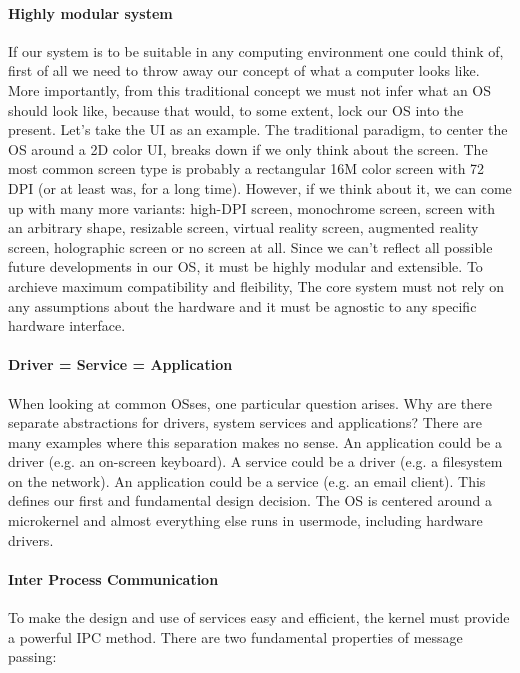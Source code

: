 \documentclass[a4paper]{article}
\begin{document}
\paragraph{Highly modular system} If our system is to be suitable in any computing environment one could think of, first of all we need to throw away our concept of what a computer looks like. More importantly, from this traditional concept we must not infer what an OS should look like, because that would, to some extent, lock our OS into the present. Let's take the UI as an example. The traditional paradigm, to center the OS around a 2D color UI, breaks down if we only think about the screen. The most common screen type is probably a rectangular 16M color screen with 72 DPI (or at least was, for a long time). However, if we think about it, we can come up with many more variants: high-DPI screen, monochrome screen, screen with an arbitrary shape, resizable screen, virtual reality screen, augmented reality screen, holographic screen or no screen at all.
Since we can't reflect all possible future developments in our OS, it must be highly modular and extensible. To archieve maximum compatibility and fleibility, The core system must not rely on any assumptions about the hardware and it must be agnostic to any specific hardware interface.

\paragraph{Driver = Service = Application} When looking at common OSses, one particular question arises. Why are there separate abstractions for drivers, system services and applications? There are many examples where this separation makes no sense. An application could be a driver (e.g. an on-screen keyboard). A service could be a driver (e.g. a filesystem on the network). An application could be a service (e.g. an email client).
This defines our first and fundamental design decision. The OS is centered around a microkernel and almost everything else runs in usermode, including hardware drivers.

\paragraph{Inter Process Communication} To make the design and use of services easy and efficient, the kernel must provide a powerful IPC method. There are two fundamental properties of message passing:
\end{document}
